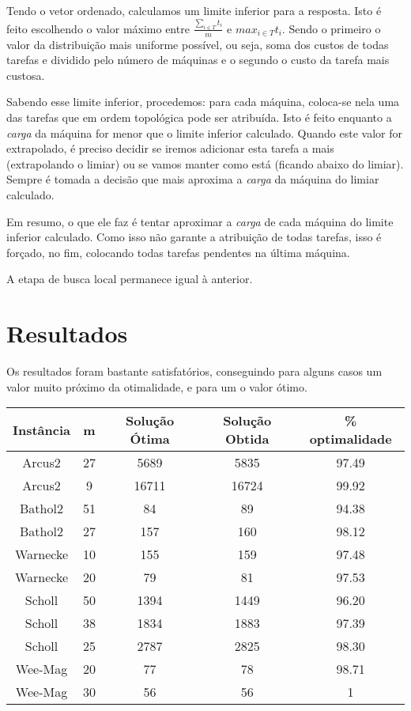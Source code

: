 \documentclass{report}
\begin{document}
Tendo o vetor ordenado, calculamos um limite inferior para a
resposta. Isto é feito escolhendo o valor máximo entre $\frac{\sum_{i\in T}t_i}{m}$
 e $max_{i\in T}t_i$. Sendo o primeiro
o valor da distribuição mais uniforme possível, ou seja,
soma dos custos de todas tarefas e dividido pelo
número de máquinas e o segundo o custo da tarefa mais custosa.

Sabendo esse limite inferior, procedemos: para cada máquina, coloca-se
nela uma das tarefas que em ordem topológica pode ser atribuída.
Isto é feito enquanto a \emph{carga}
da máquina for menor que o limite inferior
calculado. Quando este valor for extrapolado, é preciso decidir se iremos
adicionar esta tarefa a mais
(extrapolando o limiar) ou se vamos manter como está (ficando abaixo do limiar).
Sempre é tomada a decisão que mais
aproxima a \emph{carga} da máquina do limiar calculado.

Em resumo, o que ele faz é tentar aproximar a \emph{carga} de
cada máquina do limite inferior calculado.
Como isso não garante a atribuição de todas tarefas, isso é forçado, no fim,
colocando todas tarefas pendentes na última máquina.

A etapa de busca local permanece igual à anterior.

\chapter{Resultados}

Os resultados foram bastante satisfatórios, conseguindo para alguns casos um
valor muito próximo da otimalidade, e para um o valor ótimo.

\begin{table}[htbp]
 \begin{tabular}{|c|c|c|c|c|}
  \hline
  \textbf{Instância} & \textbf{m} & \textbf{Solução Ótima} & \textbf{Solução Obtida} & \% optimalidade \\
  \hline
  Arcus2 & 27 & 5689 & 5835 & 97.49 \\
  \hline
  Arcus2 & 9 & 16711 & 16724 & 99.92 \\
  \hline
  Bathol2 & 51 & 84 & 89 & 94.38 \\
  \hline
  Bathol2 & 27 & 157 & 160 & 98.12 \\
  \hline
  Warnecke & 10 & 155 & 159 & 97.48 \\
  \hline
  Warnecke & 20 & 79 & 81 & 97.53 \\
  \hline
  Scholl & 50 & 1394 & 1449 & 96.20 \\
  \hline
  Scholl & 38 & 1834 & 1883 & 97.39 \\
  \hline
  Scholl & 25 & 2787 & 2825 & 98.30 \\
  \hline
  Wee-Mag & 20 & 77 & 78 & 98.71 \\
  \hline
  Wee-Mag & 30 & 56 & 56 & 1 \\
  \hline
 \end{tabular}
\end{table}
\end{document}
